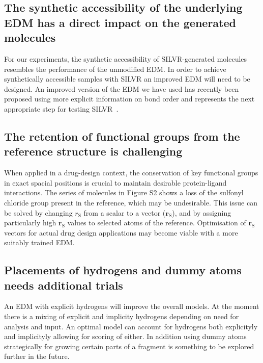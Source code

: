 \documentclass[journal=jacsat,manuscript=article]{achemso}
\begin{document}
\subsection{The synthetic accessibility of the underlying EDM has a direct impact on the generated molecules}
 For our experiments, the synthetic accessibility of SILVR-generated molecules resembles the performance of the unmodified EDM. In order to achieve synthetically accessible samples with SILVR an improved EDM will need to be designed. An improved version of the EDM we have used has recently been proposed using more explicit information on bond order and represents the next appropriate step for testing SILVR~\cite{vignac2023midi}.

\subsection{The retention of functional groups from the reference structure is challenging}
When applied in a drug-design context, the conservation of key functional groups in exact spacial positions is crucial to maintain desirable protein-ligand interactions. The series of molecules in Figure S2 shows a loss of the sulfonyl chloride group present in the reference, which may be undesirable. This issue can be solved by changing $r_{\mathrm{S}}$ from a scalar to a vector ($\mathbf{r}_{\mathrm{S}}$), and by assigning particularly high $\mathbf{r}_{\mathrm{S}}$ values to selected atoms of the reference. Optimisation of $\mathbf{r}_{\mathrm{S}}$ vectors for actual drug design applications may become viable with a more suitably trained EDM.


\subsection{Placements of hydrogens and dummy atoms needs additional trials}
An EDM with explicit hydrogens will improve the overall models. At the moment there is a mixing of explicit and implicity hydrogens depending on need for analysis and input. An optimal model can account for hydrogens both explicityly and implicityly allowing for scoring of either. In addition using dummy atoms strategically for growing certain parts of a fragment is something to be explored further in the future. 
\end{document}

